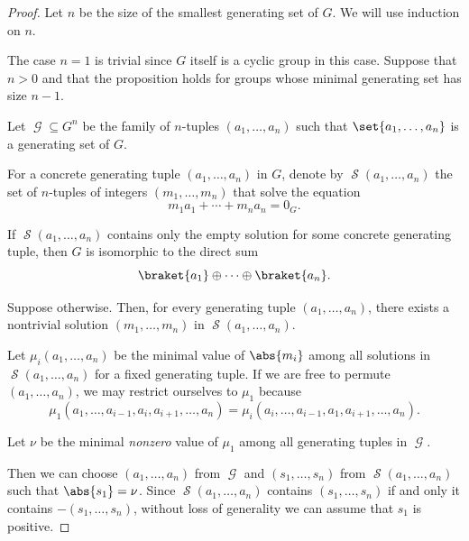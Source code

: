 \begin{proof}
  Let \( n \) be the size of the smallest generating set of \( G \). We will use induction on \( n \).

  The case \( n = 1 \) is trivial since \( G \) itself is a cyclic group in this case. Suppose that \( n > 0 \) and that the proposition holds for groups whose minimal generating set has size \( n - 1 \).

  Let \( \mscrG \subseteq G^n \) be the family of \( n \)-tuples \( (a_1, \ldots, a_n) \) such that \( \set{ a_1, \ldots, a_n } \) is a generating set of \( G \).

  For a concrete generating tuple \( (a_1, \ldots, a_n) \) in \( G \), denote by \( \mscrS(a_1, \ldots, a_n) \) the set of \( n \)-tuples of integers \( (m_1, \ldots, m_n) \) that solve the equation
  \begin{equation}\label{eq:thm:fundamental_theorem_of_finitely_generated_abelian_groups/proof/equation_general}
    m_1 a_1 + \cdots + m_n a_n = 0_G.
  \end{equation}

  If \( \mscrS(a_1, \ldots, a_n) \) contains only the empty solution for some concrete generating tuple, then \( G \) is isomorphic to the direct sum
  \begin{equation*}
    \braket{ a_1 } \oplus \cdots \oplus \braket{ a_n }.
  \end{equation*}

  Suppose otherwise. Then, for every generating tuple \( (a_1, \ldots, a_n) \), there exists a nontrivial solution \( (m_1, \ldots, m_n) \) in \( \mscrS(a_1, \ldots, a_n) \).

  Let \( \mu_i(a_1, \ldots, a_n) \) be the minimal value of \( \abs{m_i} \) among all solutions in \( \mscrS(a_1, \ldots, a_n) \) for a fixed generating tuple. If we are free to permute \( (a_1, \ldots, a_n) \), we may restrict ourselves to \( \mu_1 \) because
  \begin{equation*}
    \mu_1(a_1, \ldots, a_{i-1}, a_i, a_{i+1}, \ldots, a_n) = \mu_i(a_i, \ldots, a_{i-1}, a_1, a_{i+1}, \ldots, a_n).
  \end{equation*}

  Let \( \nu \) be the minimal \emph{nonzero} value of \( \mu_1 \) among all generating tuples in \( \mscrG \).

  Then we can choose \( (a_1, \ldots, a_n) \) from \( \mscrG \) and \( (s_1, \ldots, s_n) \) from \( \mscrS(a_1, \ldots, a_n) \) such that \( \abs{s_1} = \nu \). Since \( \mscrS(a_1, \ldots, a_n) \) contains \( (s_1, \ldots, s_n) \) if and only it contains \( -(s_1, \ldots, s_n) \), without loss of generality we can assume that \( s_1 \) is positive.


\end{proof}
